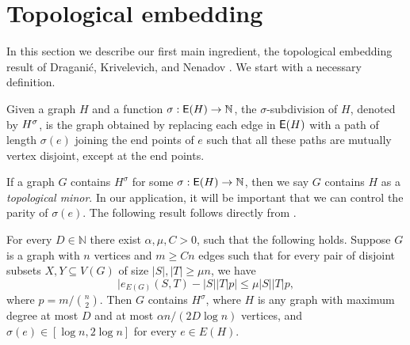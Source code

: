 \documentclass[11pt]{article}
\begin{document}



\section{Topological embedding}
\label{sec:embed-machinery}

In this section we describe our first main ingredient, the topological embedding result of Dragani\'c, Krivelevich, and Nenadov \cite{draganic22rolling}. We start with a necessary definition.

\begin{definition}\label{def:subdivisions}
Given a graph $H$ and a function $\sigma: \mathsf{E}(H) \rightarrow \mathbb{N}$, the $\sigma$-subdivision of $H$, denoted by ${H}^{\sigma}$, is the graph obtained by replacing each edge in $\mathsf{E}(H)$ with a path of length $\sigma(e)$ joining the end points of $e$ such that all these paths are mutually vertex disjoint, except at the end points.
\end{definition}

If a graph $G$ contains $H^{\sigma}$ for some $\sigma: \mathsf{E}(H) \to \mathbb{N}$, then we say $G$ contains $H$ as a \emph{topological minor}. In our application, it will be important that we can control the parity of $\sigma(e)$. The following result follows directly from \cite[Theorem 1]{draganic22rolling}. 

\begin{theorem} \label{thm:embedding_top}
For every $D \in \mathbb{N}$ there exist $\alpha, \mu, C > 0$, such that the following holds. Suppose $G$ is a graph with $n$ vertices and $m \ge Cn$ edges such that for every pair of disjoint subsets $X, Y \subseteq V(G)$ of size $|S|, |T| \ge \mu n$, we have
$$
    \bigl| e_{E(G)}(S, T) - |S||T|p \bigr| \le \mu |S||T| p, 
$$
where $p = m / \binom{n}{2}$. Then $G$ contains $H^{\sigma}$, where $H$ is any graph with maximum degree at most $D$ and at most $\alpha n / (2 D \log n)$ vertices, and $\sigma(e) \in [\log n, 2 \log n]$ for every $e \in E(H)$.    
\end{theorem}
\end{document}
